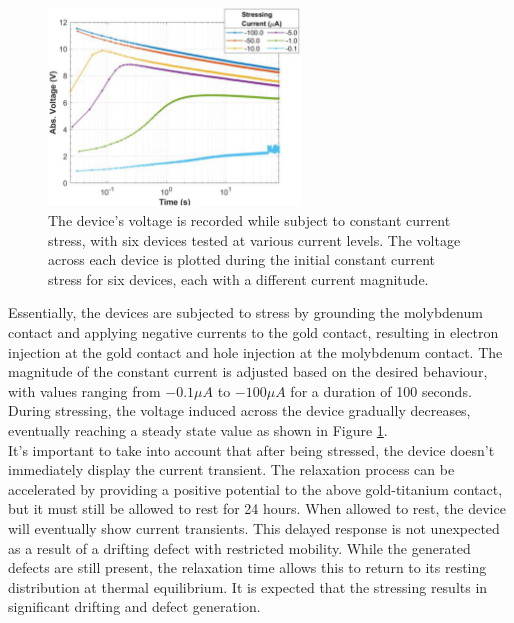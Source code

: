 \begin{figure}[htbp!] 
    \centering    
    \includegraphics[width=0.6\textwidth]{Chapter4/Figs/d.png}
    \caption[Response of devices to different magnitudes of stressing currents.]{The device's voltage is recorded while subject to constant current stress, with six devices tested at various current levels. The voltage across each device is plotted during the initial constant current stress for six devices, each with a different current magnitude.}
    \label{fig:4d}
    \end{figure}
    
\noindent Essentially, the devices are subjected to stress by grounding the molybdenum contact and applying negative currents to the gold contact, resulting in electron injection at the gold contact and hole injection at the molybdenum contact. The magnitude of the constant current is adjusted based on the desired behaviour, with values ranging from $-0.1\mu A$ to $-100\mu A$ for a duration of 100 seconds. During stressing, the voltage induced across the device gradually decreases, eventually reaching a steady state value as shown in Figure \ref{fig:4d}.\\

\noindent It's important to take into account that after being stressed, the device doesn't immediately display the current transient. The relaxation process can be accelerated by providing a positive potential to the above gold-titanium contact, but it must still be allowed to rest for 24 hours. When allowed to rest, the device will eventually show current transients. This delayed response is not unexpected as a result of a drifting defect with restricted mobility. While the generated defects are still present, the relaxation time allows this to return to its resting distribution at thermal equilibrium. It is expected that the stressing results in significant drifting and defect generation.

